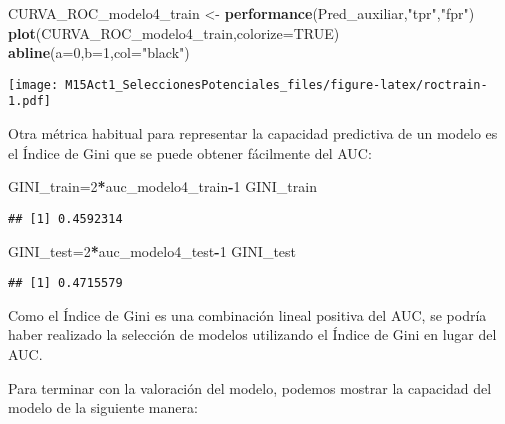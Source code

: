 \documentclass[]{article}
\newenvironment{Shaded}{\begin{snugshade}}{\end{snugshade}}
\newcommand{\KeywordTok}[1]{\textcolor[rgb]{0.13,0.29,0.53}{\textbf{#1}}}
\newcommand{\DataTypeTok}[1]{\textcolor[rgb]{0.13,0.29,0.53}{#1}}
\newcommand{\DecValTok}[1]{\textcolor[rgb]{0.00,0.00,0.81}{#1}}
\newcommand{\StringTok}[1]{\textcolor[rgb]{0.31,0.60,0.02}{#1}}
\newcommand{\OtherTok}[1]{\textcolor[rgb]{0.56,0.35,0.01}{#1}}
\newcommand{\OperatorTok}[1]{\textcolor[rgb]{0.81,0.36,0.00}{\textbf{#1}}}
\newcommand{\NormalTok}[1]{#1}
\begin{document}
\begin{Shaded}
\begin{Highlighting}[]
\NormalTok{CURVA_ROC_modelo4_train <-}\StringTok{ }\KeywordTok{performance}\NormalTok{(Pred_auxiliar,}\StringTok{"tpr"}\NormalTok{,}\StringTok{"fpr"}\NormalTok{)}
\KeywordTok{plot}\NormalTok{(CURVA_ROC_modelo4_train,}\DataTypeTok{colorize=}\OtherTok{TRUE}\NormalTok{)}
\KeywordTok{abline}\NormalTok{(}\DataTypeTok{a=}\DecValTok{0}\NormalTok{,}\DataTypeTok{b=}\DecValTok{1}\NormalTok{,}\DataTypeTok{col=}\StringTok{"black"}\NormalTok{)}
\end{Highlighting}
\end{Shaded}

\texttt{[image: M15Act1\_SeleccionesPotenciales\_files/figure-latex/roctrain-1.pdf]}

Otra métrica habitual para representar la capacidad predictiva de un
modelo es el Índice de Gini que se puede obtener fácilmente del AUC:

\begin{Shaded}
\begin{Highlighting}[]
\NormalTok{GINI_train=}\DecValTok{2}\OperatorTok{*}\NormalTok{auc_modelo4_train}\OperatorTok{-}\DecValTok{1}
\NormalTok{GINI_train}
\end{Highlighting}
\end{Shaded}

\begin{verbatim}
## [1] 0.4592314
\end{verbatim}

\begin{Shaded}
\begin{Highlighting}[]
\NormalTok{GINI_test=}\DecValTok{2}\OperatorTok{*}\NormalTok{auc_modelo4_test}\OperatorTok{-}\DecValTok{1}
\NormalTok{GINI_test}
\end{Highlighting}
\end{Shaded}

\begin{verbatim}
## [1] 0.4715579
\end{verbatim}

Como el Índice de Gini es una combinación lineal positiva del AUC, se
podría haber realizado la selección de modelos utilizando el Índice de
Gini en lugar del AUC.

Para terminar con la valoración del modelo, podemos mostrar la capacidad
del modelo de la siguiente manera:

\begin{Shaded}
\end{Shaded}
\end{document}
